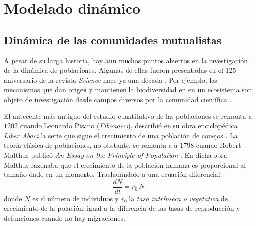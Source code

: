 
\chapter{Modelado dinámico} %

\label{DINAMICA} %


\section{Dinámica de las comunidades mutualistas}

A pesar de su larga historia, hay aun muchos puntos abiertos en la investigación de la dinámica de poblaciones. Algunas de ellas fueron presentadas en el 125 aniversario de la revista {\em Science} hace ya una década  \cite{kennedy2005,pennisi2005,stokstad2005}. Por ejemplo, los mecanismos que dan origen y mantienen la biodiversidad en en un ecosistema son objeto de investigación desde campos diversos por la comunidad científica \cite{williams2000,dunne2002biodiversity,olesen2007modularity,allesina2008,bascompte2009,saavedra2009,bastolla2009,fortuna2010nestedness,encinas2012}.  

El antecente más antiguo del estudio cuantitativo de las poblaciones se remonta a $1202$ cuando Leonardo Pisano (\textit{Fibonacci}), describió en su obra enciclopédica {\em Liber Abaci} la serie que sigue el crecimiento de una población de conejos \cite{sigler2002}. La teoría clásica de poblaciones, no obstante, se remonta a a $1798$ cuando Robert Malthus publicó {\em An Essay on the Principle of Population} \citep{malthus1798}. En dicha obra Malthus razonaba que el crecimiento de la población humana es proporcional al tamaño dado en un momento. Trasladándolo a una ecuación diferencial:
\begin{equation}
\frac{dN}{dt}=r_0\, N 
\label{eq:malthus}
\end{equation}
\noindent donde $N$ es el número de individuos y $r_0$ la {\em tasa intrínseca o vegetativa} de crecimiento de la polación, igual a la diferencia de las tasas de reproducción y defunciones cuando no hay migraciones.

